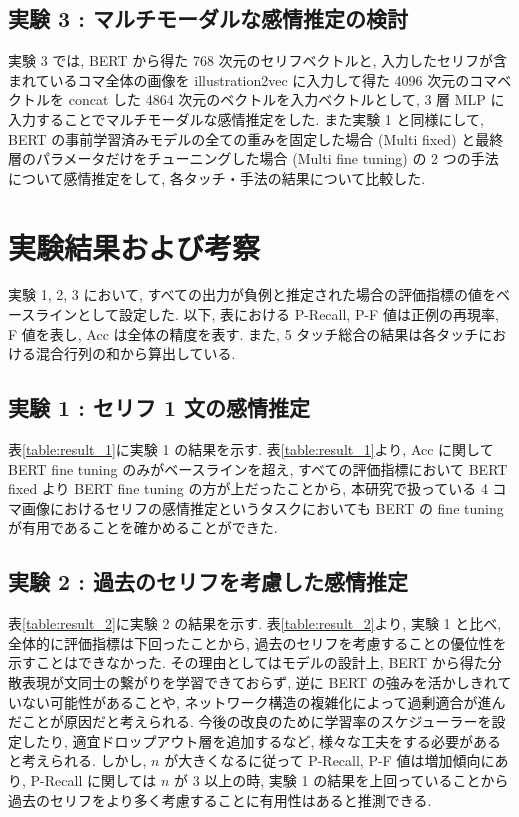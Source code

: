 \documentclass[twocolumn]{jarticle}     %
\begin{document}
\subsection{\small{実験 3 : マルチモーダルな感情推定の検討}}
実験 3 では, BERT から得た 768 次元のセリフベクトルと, 入力したセリフが含まれているコマ全体の画像を illustration2vec に入力して得た 4096 次元のコマベクトルを concat した 4864 次元のベクトルを入力ベクトルとして, 3 層 MLP に入力することでマルチモーダルな感情推定をした. また実験 1 と同様にして, BERT の事前学習済みモデルの全ての重みを固定した場合 (Multi fixed) と最終層のパラメータだけをチューニングした場合 (Multi fine tuning) の 2 つの手法について感情推定をして, 各タッチ・手法の結果について比較した.

\section{実験結果および考察}
実験 1, 2, 3 において, すべての出力が負例と推定された場合の評価指標の値をベースラインとして設定した. 以下, 表における P-Recall, P-F 値は正例の再現率, F 値を表し, Acc は全体の精度を表す. また, 5 タッチ総合の結果は各タッチにおける混合行列の和から算出している.

\subsection{\small{実験 1 : セリフ 1 文の感情推定}}
表\ref{table:result_1}に実験 1 の結果を示す.
表\ref{table:result_1}より, Acc に関して BERT fine tuning のみがベースラインを超え, すべての評価指標において BERT fixed より BERT fine tuning の方が上だったことから, 本研究で扱っている 4 コマ画像におけるセリフの感情推定というタスクにおいても BERT の fine tuning が有用であることを確かめることができた.

\subsection{\small{実験 2 : 過去のセリフを考慮した感情推定}}
表\ref{table:result_2}に実験 2 の結果を示す.
表\ref{table:result_2}より, 実験 1 と比べ, 全体的に評価指標は下回ったことから, 過去のセリフを考慮することの優位性を示すことはできなかった. その理由としてはモデルの設計上, BERT から得た分散表現が文同士の繋がりを学習できておらず, 逆に BERT の強みを活かしきれていない可能性があることや, ネットワーク構造の複雑化によって過剰適合が進んだことが原因だと考えられる. 今後の改良のために学習率のスケジューラーを設定したり, 適宜ドロップアウト層を追加するなど, 様々な工夫をする必要があると考えられる. しかし, $n$ が大きくなるに従って P-Recall, P-F 値は増加傾向にあり, P-Recall に関しては $n$ が 3 以上の時, 実験 1 の結果を上回っていることから過去のセリフをより多く考慮することに有用性はあると推測できる.
\end{document}
